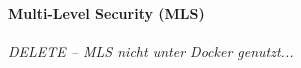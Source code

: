 \documentclass[../main.tex]{subfiles}
\begin{document}
{					%


				\paragraph{Multi-Level Security (MLS)}
					\emph{DELETE -- MLS nicht unter Docker genutzt...}




}
\end{document}
